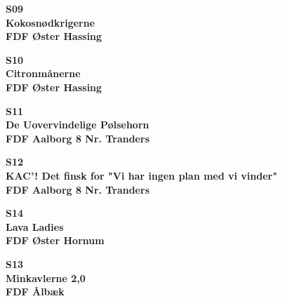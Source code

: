 \vspace*{2cm}
\begin{center}
{\fontsize{300}{60}\selectfont\textbf{\textcolor{flammefarvet}{S09}}\\}
{\fontsize{30}{50}\selectfont\textbf{\textcolor{flammefarvet}{Kokosnødkrigerne}}\\}
{\fontsize{20}{50}\selectfont\textbf{FDF Øster Hassing}\\}
\end{center}
\newpage

\vspace*{2cm}
\begin{center}
{\fontsize{300}{60}\selectfont\textbf{\textcolor{flammefarvet}{S10}}\\}
{\fontsize{30}{50}\selectfont\textbf{\textcolor{flammefarvet}{Citronmånerne}}\\}
{\fontsize{20}{50}\selectfont\textbf{FDF Øster Hassing}\\}
\end{center}
\newpage

\vspace*{2cm}
\begin{center}
{\fontsize{300}{60}\selectfont\textbf{\textcolor{flammefarvet}{S11}}\\}
{\fontsize{30}{50}\selectfont\textbf{\textcolor{flammefarvet}{De Uovervindelige Pølsehorn}}\\}
{\fontsize{20}{50}\selectfont\textbf{FDF Aalborg 8 Nr. Tranders}\\}
\end{center}
\newpage

\vspace*{2cm}
\begin{center}
{\fontsize{300}{60}\selectfont\textbf{\textcolor{flammefarvet}{S12}}\\}
{\fontsize{30}{50}\selectfont\textbf{\textcolor{flammefarvet}{KAC'! Det finsk for "Vi har ingen plan med vi vinder"}}\\}
{\fontsize{20}{50}\selectfont\textbf{FDF Aalborg 8 Nr. Tranders}\\}
\end{center}
\newpage

\vspace*{2cm}
\begin{center}
{\fontsize{300}{60}\selectfont\textbf{\textcolor{flammefarvet}{S14}}\\}
{\fontsize{30}{50}\selectfont\textbf{\textcolor{flammefarvet}{Lava Ladies}}\\}
{\fontsize{20}{50}\selectfont\textbf{FDF Øster Hornum}\\}
\end{center}
\newpage

\vspace*{2cm}
\begin{center}
{\fontsize{300}{60}\selectfont\textbf{\textcolor{flammefarvet}{S13}}\\}
{\fontsize{30}{50}\selectfont\textbf{\textcolor{flammefarvet}{Minkavlerne 2,0}}\\}
{\fontsize{20}{50}\selectfont\textbf{FDF Ålbæk}\\}
\end{center}
\newpage

